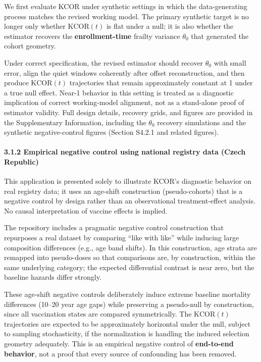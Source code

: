 \documentclass[
]{article}
\begin{document}
We first evaluate KCOR under synthetic settings in which the
data-generating process matches the revised working model. The primary
synthetic target is no longer only whether \(\mathrm{KCOR}(t)\) is flat
under a null; it is also whether the estimator recovers the
\textbf{enrollment-time} frailty variance \(\theta_0\) that generated
the cohort geometry.

Under correct specification, the revised estimator should recover
\(\theta_0\) with small error, align the quiet windows coherently after
offset reconstruction, and then produce \(\mathrm{KCOR}(t)\)
trajectories that remain approximately constant at 1 under a true null
effect. Near-1 behavior in this setting is treated as a diagnostic
implication of correct working-model alignment, not as a stand-alone
proof of estimator validity. Full design details, recovery grids, and
figures are provided in the Supplementary Information, including the
\(\theta_0\) recovery simulations and the synthetic negative-control
figures (Section S4.2.1 and related figures).

\paragraph{3.1.2 Empirical negative control using national registry data
(Czech
Republic)}\label{empirical-negative-control-using-national-registry-data-czech-republic}

This application is presented solely to illustrate KCOR's diagnostic
behavior on real registry data; it uses an age-shift construction
(pseudo-cohorts) that is a negative control by design rather than an
observational treatment-effect analysis. No causal interpretation of
vaccine effects is implied.

The repository includes a pragmatic negative control construction that
repurposes a real dataset by comparing ``like with like'' while inducing
large composition differences (e.g., age band shifts). In this
construction, age strata are remapped into pseudo-doses so that
comparisons are, by construction, within the same underlying category;
the expected differential contrast is near zero, but the baseline
hazards differ strongly.

These age-shift negative controls deliberately induce extreme baseline
mortality differences (10--20 year age gaps) while preserving a
pseudo-null by construction, since all vaccination states are compared
symmetrically. The \(\mathrm{KCOR}(t)\) trajectories are expected to be
approximately horizontal under the null, subject to sampling
stochasticity, if the normalization is handling the induced selection
geometry adequately. This is an empirical negative control of
\textbf{end-to-end behavior}, not a proof that every source of
confounding has been removed.
\end{document}
